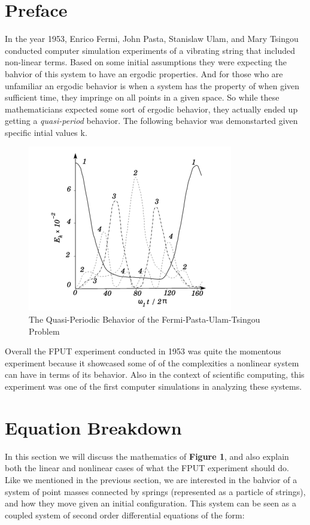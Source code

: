 \section{Preface}
\label{sec:preface}

In the year 1953, Enrico Fermi, John Pasta, Stanislaw Ulam, and Mary Tsingou conducted computer simulation experiments of a vibrating string that included non-linear terms. Based on some initial assumptions they were expecting the bahvior of this system to have an ergodic properties. And for those who are unfamiliar an ergodic behavior is when a system has the property of when given sufficient time, they impringe on all points in a given space. \cite{Anosov} So while these mathematicians expected some sort of ergodic behavior, they actually ended up getting a \emph{quasi-period} \cite{Quasi} behavior. The following behavior was demonstarted given specific intial values k. 
\begin{figure}[H]
\centering
\includegraphics[width=.35\textwidth]{figures/qpb.png}
\caption{The Quasi-Periodic Behavior of the Fermi-Pasta-Ulam-Tsingou Problem}
\end{figure}
Overall the FPUT experiment conducted in 1953 was quite the momentous experiment because it showcased some of of the complexities a nonlinear system can have in terms of its behavior. Also in the context of scientific computing, this experiment was one of the first computer simulations in analyzing these systems. 

\section{Equation Breakdown}

In this section we will discuss the mathematics of \textbf{Figure 1}, and also explain both the linear and nonlinear cases of what the FPUT experiment should do. Like we mentioned in the previous section, we are interested in the bahvior of a system of point masses connected by springs (represented as a particle of strings), and how they move given an initial configuration. This system can be seen as a coupled system of second order differential equations of the form:

